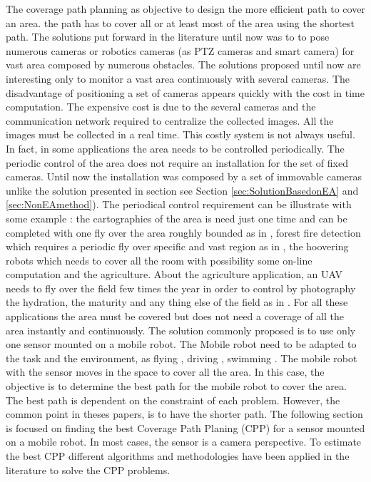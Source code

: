 The coverage path planning  as objective to design  the more efficient path to cover an area. the path has to cover all or  at least most of the area using  the shortest path. 
The solutions put forward in the literature until now was to to pose numerous cameras or robotics cameras (as PTZ cameras and smart camera) for vast area composed by numerous obstacles.
The solutions proposed until now are interesting only to monitor a vast area continuously with several cameras. 
The disadvantage of positioning a set of cameras appears quickly with the cost in time computation. The expensive cost is due to the several cameras and the communication network required to centralize the collected images. All the images must be collected in a real time. This costly system is not always useful. 
In fact, in some applications the area needs to be controlled periodically. The periodic control of the area does not require an installation for the set of fixed cameras. Until now the installation was composed by a set of immovable cameras unlike the solution presented in section see Section \ref{sec:SolutionBasedonEA} and \ref{sec:NonEAmethod}).
 The periodical control requirement can be illustrate with some example : the cartographies of the area is need just one time and can be completed with one fly over the area roughly bounded as in \citep{66*galceran2013,164*valente2013}, forest fire detection which requires a periodic fly over specific and vast region as in \cite{237*casbeer2006}, the hoovering robots which needs to cover all the room with possibility some on-line computation \citep{218*meiting2007,216*luo2002,215*lee2010,196*yang2004}  and the agriculture.
 About the agriculture application, an UAV needs to fly over the field few times the year in order to control by photography the hydration, the maturity and any thing else of the field as in \citep{164*valente2013,203*zarco2008,63*chao2008,105*long199,167*barrientos2011,177*lelong2008}. %
For all these applications the area must be covered but does not need a coverage of all the area instantly and continuously. The solution commonly proposed is to use only one sensor mounted on a mobile robot. The Mobile robot need to be adapted to the task and the environment, as flying  \citep{105*long1991}, driving \citep{30*bodor2005,213*roberts2008}, swimming \cite{66*galceran2013}. The mobile robot with the sensor moves in the space to cover all the area. In this case, the objective is to determine the best path for the mobile robot to cover  the area. The best path is dependent on the constraint of each problem. However, the common point in theses papers, is to have the shorter path.
The following section is focused on finding the best Coverage Path Planing (CPP) for a sensor mounted on a mobile robot. 
In most cases,  the sensor is a camera perspective. To estimate the best CPP different algorithms and methodologies have been applied in the literature to solve the CPP problems.

